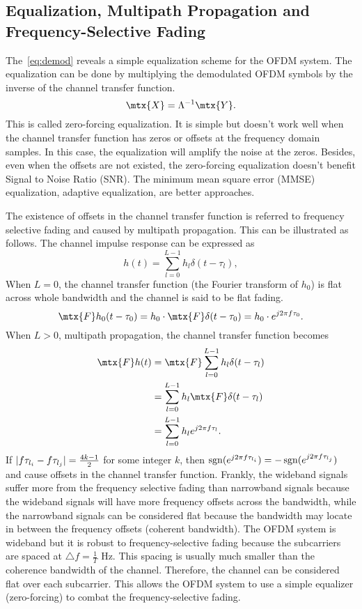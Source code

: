 \subsection{Equalization, Multipath Propagation and Frequency-Selective Fading}
The~\cref{eq:demod} reveals a simple equalization scheme for the OFDM system. The equalization can be done by multiplying the demodulated OFDM symbols by the inverse of the channel transfer function.
\begin{equation}
    \mtx{X} = \Lambda^{-1}\mtx{Y}.
\end{equation}
This is called zero-forcing equalization. It is simple but doesn't work well when the channel transfer function has zeros or offsets at the frequency domain samples. In this case, the equalization will amplify the noise at the zeros. Besides, even when the offsets are not existed, the zero-forcing equalization doesn't benefit Signal to Noise Ratio (SNR). The minimum mean square error (MMSE) equalization, adaptive equalization, \etc are better approaches.

The existence of offsets in the channel transfer function is referred to frequency selective fading and caused by multipath propagation. This can be illustrated as follows. The channel impulse response can be expressed as
\begin{equation}
    h(t) = \sum_{l=0}^{L-1}h_l\delta(t-\tau_l),
\end{equation}
When $L=0$, the channel transfer function (the Fourier transform of $h_0$) is flat across whole bandwidth and the channel is said to be flat fading.
\begin{equation}
    \mtx{F}h_0(t-\tau_0) = h_0\cdot\mtx{F}\delta(t-\tau_0) = h_0\cdot e^{j2\pi f\tau_0}.
\end{equation}
When $L>0$, \aka multipath propagation, the channel transfer function becomes
\begin{equation}
    \begin{aligned}
        \mtx{F}h(t)
        &= \mtx{F}\sum_{l=0}^{L-1}h_l\delta(t-\tau_l) \\
        &= \sum_{l=0}^{L-1}h_l\mtx{F}\delta(t-\tau_l) \\
        &= \sum_{l=0}^{L-1}h_l e^{j2\pi f\tau_l}.
    \end{aligned}
\end{equation}
If $\lvert f\tau_{l_i}-f\tau_{l_j}\rvert=\frac{4k-1}{2}$ for some integer $k$, then $\operatorname{\mathrm{sgn}}(e^{j2\pi f\tau_{l_i}})=-\operatorname{\mathrm{sgn}}(e^{j2\pi f\tau_{l_j}})$ and cause offsets in the channel transfer function. Frankly, the wideband signals suffer more from the frequency selective fading than narrowband signals because the wideband signals will have more frequency offsets across the bandwidth, while the narrowband signals can be considered flat because the bandwidth may locate in between the frequency offsets (\aka coherent bandwidth). The OFDM system is wideband but it is robust to frequency-selective fading because the subcarriers are spaced at $\triangle f=\frac{1}{T}$ Hz. This spacing is usually much smaller than the coherence bandwidth of the channel. Therefore, the channel can be considered flat over each subcarrier. This allows the OFDM system to use a simple equalizer (\ie zero-forcing) to combat the frequency-selective fading.

